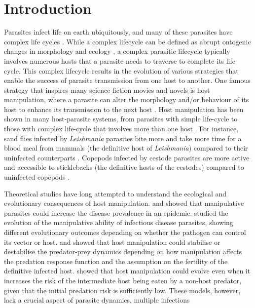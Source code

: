 \documentclass[a4paper]{scrartcl}
\begin{document}
\sffamily

\section*{Introduction}


Parasites infect life on earth ubiquitously, and many of these parasites have complex life cycles \citep{zimmer:book:2001}. 
While a complex lifecycle can be defined as abrupt ontogenic changes in morphology and ecology \citep{Benesh:2016dj}, a complex parasitic lifecycle typically involves numerous hosts that a parasite needs to traverse to complete its life cycle. 
This complex lifecycle results in the evolution of various strategies that enable the success of parasite transmission from one host to another. 
One famous strategy that inspires many science fiction movies and novels is host manipulation, where a parasite can alter the morphology and/or behaviour of its  host to enhance its transmission to the next host \citep{Hughes2012}. 
Host manipulation has been shown in many host-parasite systems, from parasites with simple life-cycle to those with complex life-cycle that involves more than one host \citep{Hughes2012,molyneux_jefferies1986}. 
For instance, sand flies infected by \textit{Leishmania} parasites bite more and take more time for a blood meal from mammals (the definitive host of \textit{Leishmania}) compared to their uninfected counterparts \citep{Rogers2007}. 
Copepods infected by cestode parasites are more active and accessible to sticklebacks (the definitive hosts of the cestodes) compared to uninfected copepods \citep{Wedekind1996}.

Theoretical studies have long attempted to understand the ecological and evolutionary consequences of host manipulation. 
\cite{Roosien2013} and \cite{Hosack2008} showed that manipulative parasites could increase the disease prevalence in an epidemic. \cite{Gandon2018} studied the evolution of the manipulative ability of infectious disease parasites, showing different evolutionary outcomes depending on whether the pathogen can control its vector or host.
\cite{Hadeler1989, Fenton2006} and \cite{Rogawa2018} showed that host manipulation could stabilise or destabilise the predator-prey dynamics depending on how manipulation affects the predation response function and the assumption on the fertility of the definitive infected host. 
\cite{Seppl2008} showed that host manipulation could evolve even when it increases the risk of the intermediate host being eaten by a non-host predator, given that the initial predation risk is sufficiently low. 
These models, however, lack a crucial aspect of parasite dynamics, multiple infections \citep{kalbe:JFB:2002} 
\end{document}

